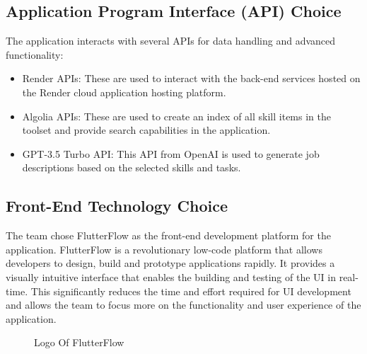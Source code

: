\subsection{ Application Program Interface (API) Choice}
The application interacts with several APIs for data handling and advanced functionality:
\begin{itemize}
    \renewcommand\labelitemi{-}
    \item Render APIs: These are used to interact with the back-end services hosted on the Render cloud application hosting platform.
    \item Algolia APIs: These are used to create an index of all skill items in the  toolset and provide search capabilities in the application.
    \item GPT-3.5 Turbo API: This API from OpenAI is used to generate job descriptions based on the selected skills and tasks.
\end{itemize}

\subsection{Front-End Technology Choice}
The team chose {\color{purple} FlutterFlow} as the front-end development platform for the application. FlutterFlow is a revolutionary low-code platform that allows developers to design, build and prototype applications rapidly. It provides a visually intuitive interface that enables the building and testing of the UI in real-time. This significantly reduces the time and effort required for UI development and allows the team to focus more on the functionality and user experience of the application.

\begin{figure}[H]
    \centering
    \caption{  Logo Of FlutterFlow }
    \label{fig:FlutterFlow_Logo}
\end{figure}

